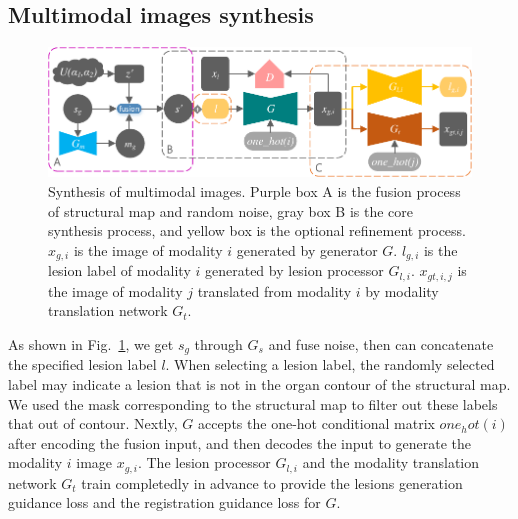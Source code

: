 \documentclass[runningheads]{llncs}
\begin{document}
	\subsection{Multimodal images synthesis}
	\begin{figure}[thbp!]
		\centering
		\includegraphics[width=0.95\columnwidth]{figures/mm_mri_generate_train}
		\caption{Synthesis of multimodal images. Purple box A is the fusion process of structural map and random noise, gray box B is the core synthesis process, and yellow box is the optional refinement process. 
			$x_{g,i}$ is the image of modality $i$ generated by generator $G$. 
			$l_{g,i}$ is the lesion label of modality $i$ generated by lesion processor $G_{l,i}$.
			$x_{gt,i,j}$ is the image of modality $j$ translated from modality $i$ by modality translation network $G_t$.
		}
		\label{mm_mri_generate}
	\end{figure}
	As shown in Fig.~\ref{mm_mri_generate}, we get $s_g$ through $G_s$ and fuse noise, then can concatenate the specified lesion label $l$. When selecting a lesion label, the randomly selected label may indicate a lesion that is not in the organ contour of the structural map. We used the mask corresponding to the structural map to filter out these labels that out of contour. Nextly, $G$ accepts the one-hot conditional matrix $one_hot(i)$ after encoding the fusion input, and then decodes the input to generate the modality $i$ image $x_{g,i}$. The lesion processor $G_{l,i}$ and the modality translation network $G_t$ train completedly in advance to provide the lesions generation guidance loss and the registration guidance loss for $G$.
	
\end{document}
